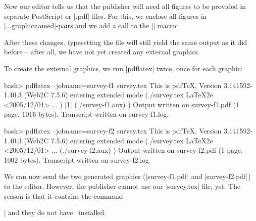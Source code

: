Now our editor tells us that the publisher will need all figures to be provided
in separate PostScript or |.pdf|-files. For this, we enclose all figures in
|...graphicnamed|-pairs and we add a call to the |\pgfrealjobname| macro:
%

After these changes, typesetting the file will still yield the same output as
it did before -- after all, we have not yet created any external graphics.

To create the external graphics, we run |pdflatex| twice, once for each
graphic:
%
\begin{codeexample}[code only, tikz syntax=false]
bash> pdflatex --jobname=survey-f1 survey.tex
This is pdfTeX, Version 3.141592-1.40.3 (Web2C 7.5.6)
entering extended mode
(./survey.tex
LaTeX2e <2005/12/01>
...
) [1] (./survey-f1.aux) )
Output written on survey-f1.pdf (1 page, 1016 bytes).
Transcript written on survey-f1.log.
\end{codeexample}

\begin{codeexample}[code only, tikz syntax=false]
bash> pdflatex --jobname=survey-f2 survey.tex
This is pdfTeX, Version 3.141592-1.40.3 (Web2C 7.5.6)
entering extended mode
(./survey.tex
LaTeX2e <2005/12/01>
...
(./survey-f2.aux) )
Output written on survey-f2.pdf (1 page, 1002 bytes).
Transcript written on survey-f2.log.
\end{codeexample}

We can now send the two generated graphics (|survey-f1.pdf| and
|survey-f2.pdf|) to the editor. However, the publisher cannot use our
|survey.tex| file, yet. The reason is that it contains the command
|\usepackage{tikz}| and they do not have \pgfname\ installed.

